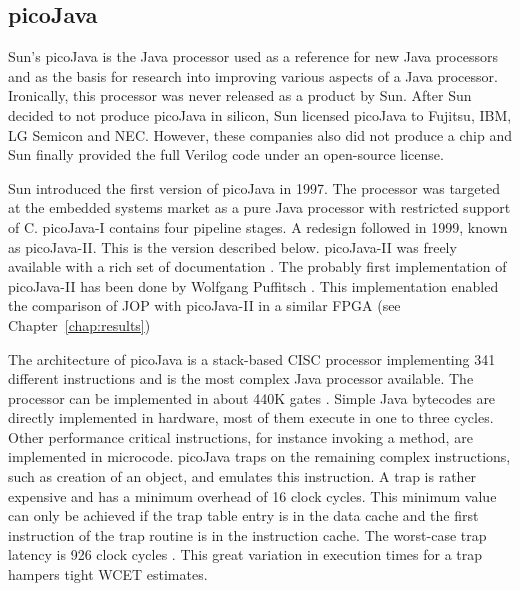 \subsection{picoJava}
\label{subsec:related:picojava} 

Sun's picoJava is the Java processor used as a reference for new Java
processors and as the basis for research into improving various
aspects of a Java processor. Ironically, this processor was never
released as a product by Sun. After Sun decided to not produce
picoJava in silicon, Sun licensed picoJava to Fujitsu, IBM, LG
Semicon and NEC. However, these companies also did not produce a chip
and Sun finally provided the full Verilog code under an open-source
license.

Sun introduced the first version of picoJava \cite{pJ1} in 1997. The
processor was targeted at the embedded systems market as a pure Java
processor with restricted support of C. picoJava-I contains four
pipeline stages. A redesign followed in 1999, known as picoJava-II.
This is the version described below. picoJava-II was freely available
with a rich set of documentation \cite{pjMicroArch, pjProgRef}. The
probably first implementation of picoJava-II has been done by
Wolfgang Puffitsch \cite{master:puffitsch, pjfpga}. This
implementation enabled the comparison of JOP with picoJava-II in a
similar FPGA (see Chapter~\ref{chap:results})


The architecture of picoJava is a stack-based CISC processor
implementing 341 different instructions and is the most complex Java
processor available. The processor can be implemented in about 440K
gates \cite{Sekar2000}.
%
Simple Java bytecodes are directly implemented in hardware, most of
them execute in one to three cycles. Other performance critical
instructions, for instance invoking a method, are implemented in
microcode. picoJava traps on the remaining complex instructions, such
as creation of an object, and emulates this instruction. A trap is
rather expensive and has a minimum overhead of 16 clock cycles. This
minimum value can only be achieved if the trap table entry is in the
data cache and the first instruction of the trap routine is in the
instruction cache. The worst-case trap latency is 926 clock cycles
\cite{pjProgRef}. This great variation in execution times for a trap
hampers tight WCET estimates.

